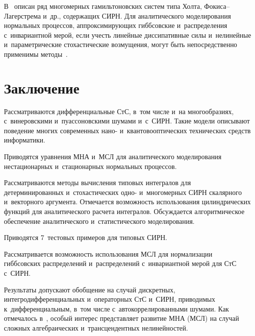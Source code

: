 \begin{multicols}{2}
\vspace*{-2pt}

В~\cite{11-sin} описан ряд многомерных гамильтоновских систем типа Холта,
Фо\-ки\-са--Ла\-гер\-стре\-ма и~др., содержащих СИРН. Для аналитического
моделирования нормальных процессов, аппроксимирующих гиббсовские
и~распределения с~инвариантной мерой, если учесть линейные диссипативные силы
и~нелинейные и~параметрические  стохастические возмущения,  могут быть
непосредственно применимы методы~\cite{1-sin, 2-sin, 12-sin}.

\vspace*{-12pt}

\section{Заключение}

\vspace*{-2pt}

Рассматриваются  дифференциальные СтС, в~том числе и~на многообразиях,
с~винеровскими и~пуассоновскими шумами и~с~СИРН. Такие модели описывают
поведение многих современных на\-но- и~квантовооптических  технических средств
информатики.

Приводятся уравнения МНА
и~МСЛ для аналитического моделирования нестационарных
и~стационарных нормальных процессов.

Рассматриваются методы вычисления типовых интегралов для детерминированных
и~стохастических одно- и~многомерных  СИРН скалярного и~векторного аргумента.
Отмечается возможность использования цилиндрических функций для аналитического
расчета интегралов. Обсуждается алгоритмическое обеспечение аналитического
и~статистического моделирования.

Приводятся 7~тес\-то\-вых примеров для типовых СИРН.

Рассматривается возможность использования МСЛ для нормализации
гиббсовских распределений и~распределений с~инвариантной мерой для СтС  с~СИРН.

Результаты допускают обобщение на случай дискрет\-ных, интегродифференциальных
и~операторных СтС и~СИРН, приводимых к~дифференциальным, в~том числе
с~автокоррелированными шумами. Как отмечалось в~\cite{6-sin, 7-sin},
особый интерес представляет развитие МНА (МСЛ) на случай сложных алгебраических
и~трансцендентных нелинейностей.

\vspace*{-9pt}

{\small\frenchspacing
 {%
 \begin{thebibliography}{99}


\end{thebibliography}}}
\end{multicols}
